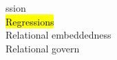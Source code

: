 \documentclass[a4paper]{article}
\begin{document}
\begin{multicols*}{2}
\begin{footnotesize}
ssion \\ \hl{Regressions} \\ Relational embeddedness \\ Relational govern
\end{footnotesize}
\end{multicols*}
\end{document}
